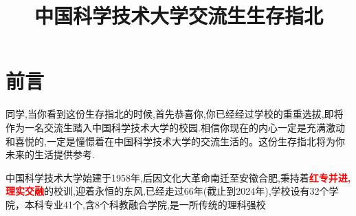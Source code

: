 \documentclass{ctexart}
\title{中国科学技术大学交流生生存指北}
\author{ }
\date{ }
\begin{document}
\maketitle

\section{前言}
同学,当你看到这份生存指北的时候,首先恭喜你,你已经经过学校的重重选拔,即将作为一名交流生踏入中国科学技术大学的校园.相信你现在的内心一定是充满激动和喜悦的,一定是憧憬着在中国科学技术大学的交流生活的。这份生存指北将为你未来的生活提供参考.
\par 中国科学技术大学始建于1958年,后因文化大革命南迁至安徽合肥,秉持着{\bf{\textcolor{red}{红专并进,理实交融}}}的校训,迎着永恒的东风,已经走过66年(截止到2024年),学校设有32个学院，本科专业41个,含8个科教融合学院,是一所传统的理科强校
\end{document}
